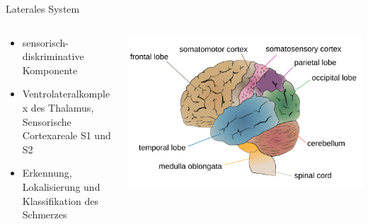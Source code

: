 \documentclass{beamer}
\begin{document}
\begin{frame}{Laterales System}
    
    \begin{columns}[c]
    
    \begin{column}{5cm}
\begin{itemize}
\item
sensorisch-diskriminative Komponente
    \item Ventrolateralkomplex des Thalamus, Sensorische Cortexareale S1 und S2
    \item
    Erkennung, Lokalisierung und Klassifikation des Schmerzes
\end{itemize}
    
    \end{column}


    \begin{column}{5cm}
\begin{center}
    \includegraphics[width=\textwidth]{Cerebrum_lobes.png}
\end{center}    
    \end{column}
    
    \end{columns}
    
  
    
\end{frame}
\end{document}
